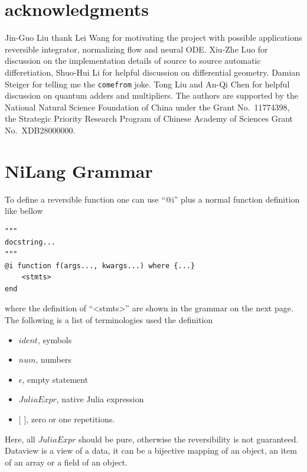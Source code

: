 \documentclass[aps,twocolumn,longbibliography,english,superscriptaddress]{revtex4-1}
\newcommand{\<}{\langle}
\renewcommand{\>}{\rangle}
\newcommand{\blue}[1]{[{\bf  \color{blue}{JG: #1}}]}
\theoremstyle{definition}\newtheorem{definition}{\textit{Definition}}
\begin{document}

\section{acknowledgments}
Jin-Guo Liu thank Lei Wang for motivating the project with possible applications reversible integrator, normalizing flow and neural ODE.
Xiu-Zhe Luo for discussion on the implementation details of source to source automatic differetiation,
Shuo-Hui Li for helpful discussion on differential geometry.
Damian Steiger for telling me the \texttt{comefrom} joke.
Tong Liu and An-Qi Chen for helpful discussion on quantum adders and multipliers.
The authors are supported by the National Natural Science Foundation of China under the Grant No.~11774398, the Strategic Priority Research Program of Chinese Academy of Sciences Grant No.~XDB28000000.




\pagebreak
\appendix

\section{NiLang Grammar}\label{app:grammar}

To define a reversible function one can use ``@i'' plus a normal function definition like bellow

\begin{minipage}{.44\textwidth}
\begin{lstlisting}[basicstyle=\small\ttfamily,columns=fullflexible]
"""
docstring...
"""
@i function f(args..., kwargs...) where {...}
    <stmts>
end
\end{lstlisting}
\end{minipage}
where the definition of ``<stmts>'' are shown in the grammar on the next page.
The following is a list of terminologies used the definition
\begin{itemize}
    \item $ident$, symbols
    \item $num$, numbers
    \item $\epsilon$, empty statement
    \item $JuliaExpr$, native Julia expression
    \item $[$ $]$,  zero or one repetitions.
\end{itemize}
Here, all $JuliaExpr$ should be pure, otherwise the reversibility is not guaranteed.
Dataview is a view of a data, it can be a bijective mapping of an object, an item of an array or a field of an object.
\end{document}
